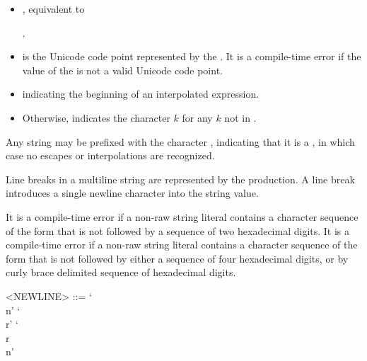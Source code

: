 \documentclass[makeidx]{article}
\begin{document}
{\begin{itemize}
  .
\item
  ,
  equivalent to

  \noindent
  .
\item
   is
  the Unicode code point represented by the
  .
  It is a compile-time error if the value of the
  is not a valid Unicode code point.
\item
  \lit{\$} indicating the beginning of an interpolated expression.
\item
  { %
    \def\k{$k$}
    Otherwise, \syntax{`\\\k'} indicates the character \k{} for
    any \k{} not in .
  }
\end{itemize}

\LMHash{}%
Any string may be prefixed with the character ,
indicating that it is a ,
in which case no escapes or interpolations are recognized.

\LMHash{}%
Line breaks in a multiline string are represented by
the  production.
A line break introduces a single newline character into the string value.

\LMHash{}%
It is a compile-time error if a non-raw string literal contains
a character sequence of the form  that is not followed by
a sequence of two hexadecimal digits.
It is a compile-time error if a non-raw string literal contains
a character sequence of the form  that is not followed by
either a sequence of four hexadecimal digits,
or by curly brace delimited sequence of hexadecimal digits.

\begin{grammar}
<NEWLINE> ::= `\\n'
  \alt `\\r'
  \alt `\\r\\n'
\end{grammar}

}
\end{document}
